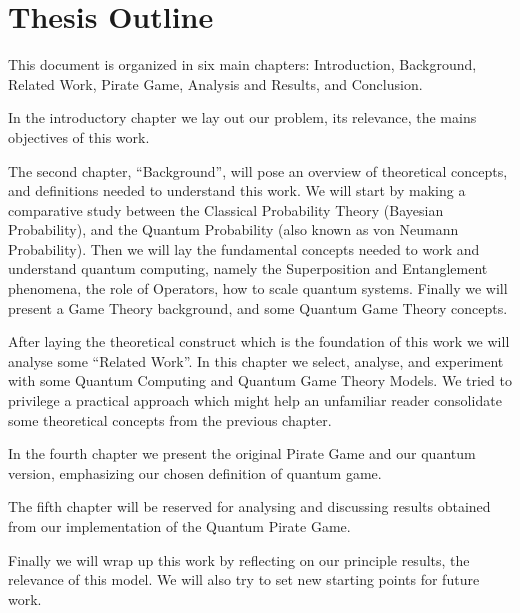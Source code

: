 \section{Thesis Outline}
\label{sec:int_outline}

This document is organized in six main chapters: Introduction, Background, Related Work, Pirate Game, Analysis and Results, and Conclusion. 

In the introductory chapter we lay out our problem, its relevance, the mains objectives of this work.

The second chapter, ``Background'', will pose an overview of theoretical concepts, and definitions needed to understand this work. We will start by making a comparative study between the Classical Probability Theory (Bayesian Probability), and the Quantum Probability (also known as von Neumann Probability). Then we will lay the fundamental concepts needed to work and understand quantum computing, namely the Superposition and Entanglement phenomena, the role of Operators, how to scale quantum systems. Finally we will present a Game Theory background, and some Quantum Game Theory concepts.

After laying the theoretical construct which is the foundation of this work we will analyse some ``Related Work''. In this chapter we select, analyse, and experiment with some Quantum Computing and Quantum Game Theory Models. We tried to privilege a practical approach which might help an unfamiliar reader consolidate some theoretical concepts from the previous chapter. 

In the fourth chapter we present the original Pirate Game and our quantum version, emphasizing our chosen definition of quantum game. 

The fifth chapter will be reserved for analysing and discussing results obtained from our implementation of the Quantum Pirate Game.

Finally we will wrap up this work by reflecting on our principle results, the relevance of this model. We will also try to set new starting points for future work. 